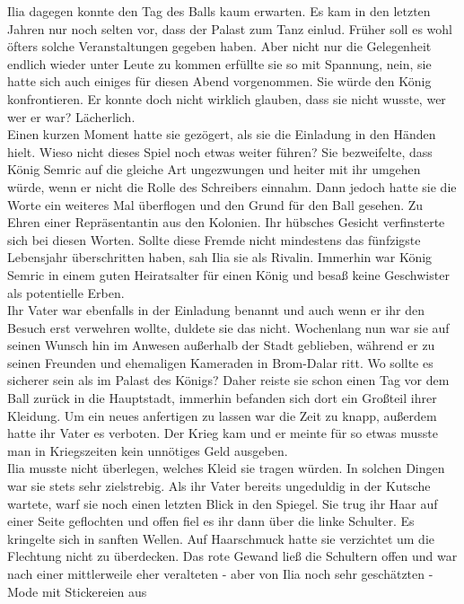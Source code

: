 Ilia dagegen konnte den Tag des Balls kaum erwarten. Es kam in den letzten Jahren nur noch selten 
vor, dass der Palast zum Tanz einlud. Früher soll es wohl öfters solche Veranstaltungen gegeben 
haben. Aber nicht nur die Gelegenheit endlich wieder unter Leute zu kommen erfüllte sie so mit 
Spannung, nein, sie hatte sich auch einiges für diesen Abend vorgenommen. Sie würde den König 
konfrontieren. Er konnte doch nicht wirklich glauben, dass sie nicht wusste, wer wer er war? 
Lächerlich.\\
Einen kurzen Moment hatte sie gezögert, als sie die Einladung in den Händen hielt. Wieso nicht 
dieses Spiel noch etwas weiter führen? Sie bezweifelte, dass König Semric auf die gleiche Art 
ungezwungen und heiter mit ihr umgehen würde, wenn er nicht die Rolle des Schreibers einnahm. Dann 
jedoch hatte sie die Worte ein weiteres Mal überflogen und den Grund für den Ball gesehen. Zu Ehren 
einer Repräsentantin aus den Kolonien. Ihr hübsches Gesicht verfinsterte sich bei diesen Worten. 
Sollte diese Fremde nicht mindestens das fünfzigste Lebensjahr überschritten haben, sah Ilia sie 
als Rivalin. Immerhin war König Semric in einem guten Heiratsalter für einen König und besaß 
keine Geschwister als potentielle Erben.\\
Ihr Vater war ebenfalls in der Einladung benannt und auch wenn er ihr den Besuch erst verwehren 
wollte, duldete sie das nicht. Wochenlang nun war sie auf seinen Wunsch hin im Anwesen 
außerhalb der Stadt geblieben, während er zu seinen Freunden und ehemaligen Kameraden in Brom-Dalar 
ritt. Wo sollte es sicherer sein als im Palast des Königs? Daher reiste sie schon einen Tag vor dem 
Ball zurück in die Hauptstadt, immerhin befanden sich dort ein Großteil ihrer Kleidung. Um ein 
neues anfertigen zu lassen war die Zeit zu knapp, außerdem hatte ihr Vater es verboten. Der Krieg 
kam und er meinte für so etwas musste man in Kriegszeiten kein unnötiges Geld ausgeben.\\
Ilia musste nicht überlegen, welches Kleid sie tragen würden. In solchen Dingen war sie stets sehr 
zielstrebig. Als ihr Vater bereits ungeduldig in der Kutsche wartete, warf sie noch einen letzten 
Blick in den Spiegel. Sie trug ihr Haar auf einer Seite geflochten und offen fiel es ihr dann über 
die linke Schulter. Es kringelte sich in sanften Wellen. Auf Haarschmuck hatte sie verzichtet um 
die Flechtung nicht zu überdecken. Das rote Gewand ließ die Schultern offen und war nach einer 
mittlerweile eher veralteten - aber von Ilia noch sehr geschätzten - Mode mit Stickereien aus 
